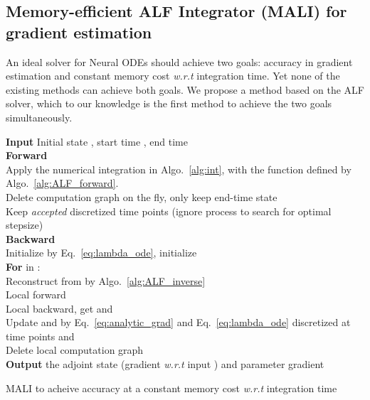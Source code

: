 \documentclass{article} \usepackage{iclr2021_conference,times}
\begin{document}
\subsection{Memory-efficient ALF Integrator (MALI) for gradient estimation}
\label{subsec:ALF_all}
\vspace{-1mm}
An ideal solver for Neural ODEs should achieve two goals: accuracy in gradient estimation and constant memory cost \textit{w.r.t} integration time. Yet none of the existing methods can achieve both goals.
We propose a method based on the ALF solver, 
which to our knowledge is the first method to achieve the two goals simultaneously. 
\begin{algorithm}
\textbf{Input} Initial state , start time , end time \\
\textbf{Forward} \\
\hspace{4mm}Apply the numerical integration in Algo.~\ref{alg:int}, with the  function defined by Algo.~\ref{alg:ALF_forward}. \\
\hspace{4mm}Delete computation graph on the fly, only keep end-time state  \\ 
\hspace{4mm}Keep \textit{accepted} discretized time points  (ignore process to search for optimal stepsize) \\
\textbf{Backward}\\
\hspace{4mm} Initialize  by Eq.~\ref{eq:lambda_ode}, initialize \\
\hspace{4mm} \textbf{For}  in : \\
\hspace{10mm} Reconstruct  from  by Algo.~\ref{alg:ALF_inverse} \\
\hspace{10mm} Local forward  \\
\hspace{10mm} Local backward, get  and  
\\
\hspace{10mm} Update  and  by Eq.~\ref{eq:analytic_grad} and Eq.~\ref{eq:lambda_ode} discretized at time points  and  \\
\hspace{10mm} Delete local computation graph \\\hspace{4mm} \textbf{Output} the adjoint state  (gradient \textit{w.r.t} input ) and parameter gradient 
\caption{MALI to acheive accuracy at a constant memory cost \textit{w.r.t} integration time}
\label{alg:ALF_all} 
\end{algorithm}\\
\end{document}
